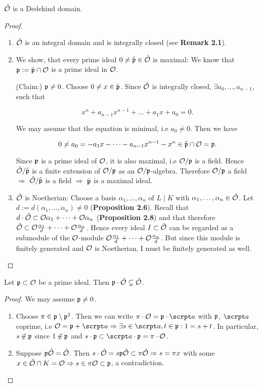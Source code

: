 \begin{Prop}
	$\hat{\mathcal{O}}$ is a Dedekind domain.
\end{Prop}
\begin{proof}
	\begin{enumerate}[(1)]
		\item $\hat{\mathcal{O}}$ is an integral domain and is integrally closed (see \textbf{Remark 2.1}).
		
		\item We show, that every prime ideal $0 \neq \hat{\mathfrak{p}} \in \hat{\mathcal{O}}$ is maximal:
		We know that $\mathfrak{p} := \hat{\mathfrak{p}} \cap \mathcal{O}$ is a prime ideal in $\mathcal{O}$.
		
		\underline(Claim:) $\mathfrak{p} \neq 0$. Choose $0 \neq x \in \hat{\mathfrak{p}}$. Since $\hat{\mathcal{O}}$ is integrally closed, $\exists a_0, \dots, a_{n-1}$, such that
		
		\[ x^n + a_{n-1}x^{n-1}+ \dots +a_1x + a_0 = 0.	\]
		
		We may assume that the equation is minimal, i.e $a_0 \neq 0$. Then we have
		
		\[ 0 \neq a_0 = -a_1x - \dots - a_{n-1}x^{n-1} - x^n \in \hat{\mathfrak{p}} \cap \mathcal{O} = \mathfrak{p}.  \]
		
		Since $\mathfrak{p}$ is a prime ideal of $\mathcal{O}$, it is also maximal, i.e $\mathcal{O} / \mathfrak{p}$ is a field. Hence $\hat{\mathcal{O}} / \hat{\mathfrak{p}}$ is a finite extension of  $\mathcal{O}/\mathfrak{p}$ as an $\mathcal{O}/\mathfrak{p}$-algebra. Therefore $\mathcal{O}/\mathfrak{p}$ a field $\Rightarrow$ $\hat{\mathcal{O}}/\hat{\mathfrak{p}}$ is a field $\Rightarrow$ $\hat{\mathfrak{p}}$ is a maximal ideal.
		
		\item $\hat{\mathcal{O}}$ is Noetherian:
		Choose a basis $\alpha_1, \dots, \alpha_n$ of $L \mid K$ with $\alpha_1, \dots, \alpha_n \in \hat{\mathcal{O}}$. Let $d:=d(\alpha_1, \dots, \alpha_n) \neq 0$ (\textbf{Proposition 2.6}). Recall that $d \cdot \hat{\mathcal{O}} \subset \mathcal{O}\alpha_1+\dots+\mathcal{O}\alpha_n$ (\textbf{Proposition 2.8}) and that therefore $\hat{\mathcal{O}} \subset \mathcal{O}\frac{\alpha_1}{d} + \dots + \mathcal{O}\frac{\alpha_n}{d}$. Hence every ideal $I \subset \hat{\mathcal{O}}$ can be regarded as a submodule of the $\mathcal{O}$-module $\mathcal{O}\frac{\alpha_1}{d} + \dots + \mathcal{O}\frac{\alpha_n}{d}$. But since this module is finitely generated and $\mathcal{O}$ is Noetherian, I must be finitely generated as well.
	\end{enumerate}
\end{proof}

\begin{Prop}
	Let $\mathfrak{p} \subset \mathcal{O}$ be a prime ideal. Then $\mathfrak{p} \cdot \hat{\mathcal{O}} \subsetneq \hat{\mathcal{O}}$.
\end{Prop}
\begin{proof}
	We may assume $\mathfrak{p} \neq 0 $.
	\begin{enumerate}[(1)]
		\item Choose $\pi \in \mathfrak{p} \setminus \mathfrak{p}^2$. Then we can write $\pi \cdot \O = \p \cdot \a$ with $\mathfrak{p}$, $\a$ coprime, i.e $\O = \p + \a \Rightarrow \exists s\in\a, t\in\p: 1=s+t$. In particular, $s\not\in \mathfrak{p}$ since $1 \not\in \mathfrak{p}$ and $s\cdot \p \subset \a \cdot \p = \pi \cdot \O$.
		
		\item Suppose $\mathfrak{p}\hat{\mathcal{O}} = \hat{\mathcal{O}}$. Then $s \cdot \hat{\mathcal{O}} = s\mathfrak{p}\hat{\mathcal{O}} \subset \pi\hat{\mathcal{O}} \Rightarrow s = \pi x$ with some $x \in \hat{\mathcal{O}} \cap K = \mathcal{O} \Rightarrow s \in \pi\mathcal{O} \subset \mathfrak{p}$, a contradiction.
	\end{enumerate}
\end{proof}

